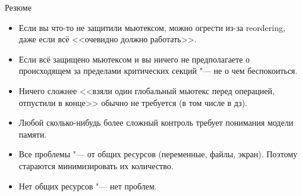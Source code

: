 \begin{frame}[fragile]{Резюме}
	\begin{itemize}
		\item Если вы что-то не защитили мьютексом, можно огрести из-за reordering, даже если всё <<очевидно должно работать>>.
		\item Если всё защищено мьютексом и вы ничего не предполагаете о происходящем за пределами критических секций "--- не о чем беспокоиться.
		\item Ничего сложнее <<взяли один глобальный мьютекс перед операцией, отпустили в конце>> обычно не требуется (в том числе в дз).
		\item Любой сколько-нибудь более сложный контроль требует понимания модели памяти.
		\item
			Все проблемы "--- от общих ресурсов (переменные, файлы, экран).
			Поэтому стараются минимизировать их количество.
		\item Нет общих ресурсов "--- нет проблем.
	\end{itemize}
\end{frame}

